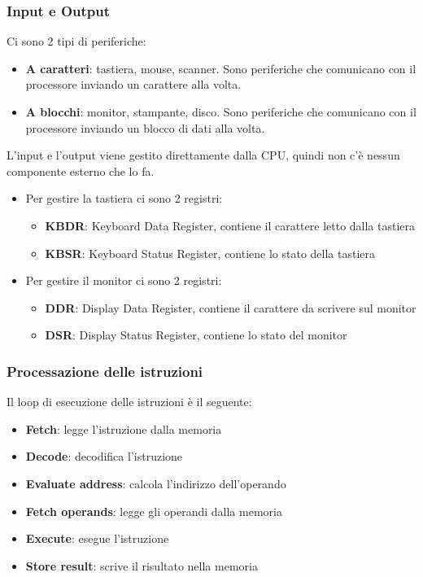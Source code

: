 \documentclass[a4paper]{article}
\theoremstyle{break}
\theoremstyle{break}
\theoremstyle{break}
\theoremstyle{break}
\begin{document}
\subsubsection{Input e Output}
Ci sono 2 tipi di periferiche:
\begin{itemize}
	\item \textbf{A caratteri}: tastiera, mouse, scanner. Sono periferiche che comunicano
	      con il processore inviando un carattere alla volta.
	\item \textbf{A blocchi}: monitor, stampante, disco. Sono periferiche che comunicano
	      con il processore inviando un blocco di dati alla volta.
\end{itemize}
L'input e l'output viene gestito direttamente dalla CPU, quindi non c'è nessun componente
esterno che lo fa.
\begin{itemize}
	\item Per gestire la tastiera ci sono 2 registri:
	      \begin{itemize}
		      \item \textbf{KBDR}: Keyboard Data Register, contiene il carattere letto dalla tastiera
		      \item \textbf{KBSR}: Keyboard Status Register, contiene lo stato della tastiera
	      \end{itemize}
	\item Per gestire il monitor ci sono 2 registri:
	      \begin{itemize}
		      \item \textbf{DDR}: Display Data Register, contiene il carattere da scrivere sul monitor
		      \item \textbf{DSR}: Display Status Register, contiene lo stato del monitor
	      \end{itemize}
\end{itemize}

\subsubsection{Processazione delle istruzioni}
Il loop di esecuzione delle istruzioni è il seguente:
\begin{itemize}
	\item \textbf{Fetch}: legge l'istruzione dalla memoria
	\item \textbf{Decode}: decodifica l'istruzione
	\item \textbf{Evaluate address}: calcola l'indirizzo dell'operando
	\item \textbf{Fetch operands}: legge gli operandi dalla memoria
	\item \textbf{Execute}: esegue l'istruzione
	\item \textbf{Store result}: scrive il risultato nella memoria
\end{itemize}
\end{document}
